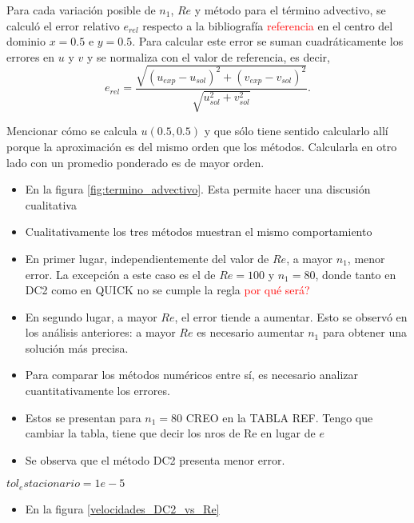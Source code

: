 \documentclass[aps,prb,twocolumn,superscriptaddress,floatfix,longbibliography,10pt]{revtex4-2}
\newif\ifptitle
\newif\ifpnumber
\newcounter{para}
\newcommand\ptitle[1]{\par\refstepcounter{para}
{\ifpnumber{\noindent\textcolor{lightgray}{\textbf{\thepara}}\indent}\fi}
{\ifptitle{\textbf{[{#1}]}}\fi}}
\begin{document}
\ptitle{Comparación numérica entre métodos numéricos para distintos $Re$.}
Para cada variación posible de $n_1$, $Re$ y método para el término advectivo, se calculó el error relativo $e_{rel}$ respecto a la bibliografía \textcolor{red}{referencia} en el centro del dominio $x = 0.5$ e $y = 0.5$. Para calcular este error se suman cuadráticamente los errores en $u$ y $v$ y se normaliza con el valor de referencia, es decir,
\[e_{rel} = \frac{\sqrt{(u_{exp} - u_{sol})^2 + (v_{exp} - v_{sol})^2}}{\sqrt{u_{sol}^2 + v_{sol}^2}}. \]

Mencionar cómo se calcula $u(0.5,0.5)$ y que sólo tiene sentido calcularlo allí porque la aproximación es del mismo orden que los métodos. Calcularla en otro lado con un promedio ponderado es de mayor orden.

\begin{itemize}
  \item En la figura \ref{fig:termino_advectivo}. Esta permite hacer una discusión cualitativa
  \item Cualitativamente los tres métodos muestran el mismo comportamiento
  \item En primer lugar, independientemente del valor de $Re$, a mayor $n_1$, menor error. La excepción a este caso es el de $Re = 100$ y $n_1 = 80$, donde tanto en DC2 como en QUICK no se cumple la regla \textcolor{red}{por qué será?}
  \item En segundo lugar, a mayor $Re$, el error tiende a aumentar. Esto se observó en los análisis anteriores: a mayor $Re$ es necesario aumentar $n_1$ para obtener una solución más precisa.
  \item Para comparar los métodos numéricos entre sí, es necesario analizar cuantitativamente los errores.
  \item Estos se presentan para $n_1 = 80$ CREO en la TABLA REF. Tengo que cambiar la tabla, tiene que decir los nros de Re en lugar de $e$
  \item Se observa que el método DC2 presenta menor error.
\end{itemize}

$tol_estacionario = 1e-5$

\begin{itemize}
  \item En la figura \ref{velocidades_DC2_vs_Re}
\end{itemize}


\onecolumngrid
\end{document}
